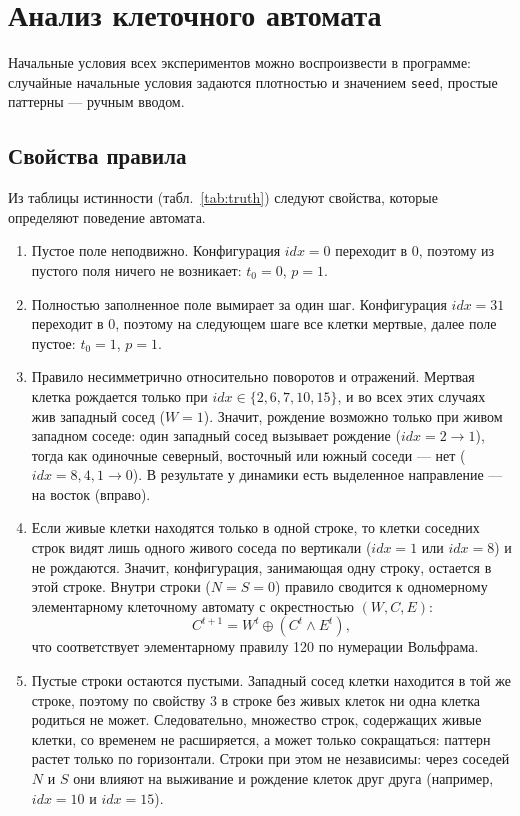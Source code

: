 \newpage
\section{Анализ клеточного автомата}
\label{sec:analysis}

Начальные условия всех экспериментов можно воспроизвести в программе: случайные начальные условия задаются плотностью и значением \texttt{seed}, простые паттерны --- ручным вводом.

\subsection{Свойства правила}

Из таблицы истинности (табл.~\ref{tab:truth}) следуют свойства, которые определяют поведение автомата.
\begin{enumerate}
	\item {Пустое поле неподвижно.} Конфигурация $idx = 0$ переходит в 0, поэтому из пустого поля ничего не возникает: $t_0 = 0$, $p = 1$.
	\item {Полностью заполненное поле вымирает за один шаг.} Конфигурация $idx = 31$ переходит в 0, поэтому на следующем шаге все клетки мертвые, далее поле пустое: $t_0 = 1$, $p = 1$.
	\item Правило несимметрично относительно поворотов и отражений. Мертвая клетка рождается только при $idx \in \{2, 6, 7, 10, 15\}$, и во всех этих случаях жив западный сосед ($W = 1$). Значит, рождение возможно только при живом западном соседе: один западный сосед вызывает рождение ($idx = 2 \to 1$), тогда как одиночные северный, восточный или южный соседи --- нет ($idx = 8, 4, 1 \to 0$). В результате у динамики есть выделенное направление --- на восток (вправо).
	\item Если живые клетки находятся только в одной строке, то клетки соседних строк видят лишь одного живого соседа по вертикали ($idx = 1$ или $idx = 8$) и не рождаются. Значит, конфигурация, занимающая одну строку, остается в этой строке. Внутри строки ($N = S = 0$) правило сводится к одномерному элементарному клеточному автомату с окрестностью $(W, C, E)$:
	\[
		C^{t+1} = W^t \oplus (C^t \wedge E^t),
	\]
	что соответствует элементарному правилу 120 по нумерации Вольфрама.
	\item {Пустые строки остаются пустыми.} Западный сосед клетки находится в той же строке, поэтому по свойству 3 в строке без живых клеток ни одна клетка родиться не может. Следовательно, множество строк, содержащих живые клетки, со временем не расширяется, а может только сокращаться: паттерн растет только по горизонтали. Строки при этом не независимы: через соседей $N$ и $S$ они влияют на выживание и рождение клеток друг друга (например, $idx = 10$ и $idx = 15$).
\end{enumerate}

